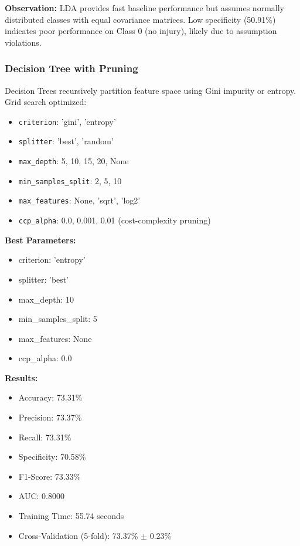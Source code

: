 \documentclass[12pt,man]{apa7}
\begin{document}
\textbf{Observation:} LDA provides fast baseline performance but assumes normally distributed classes with equal covariance matrices. Low specificity (50.91\%) indicates poor performance on Class 0 (no injury), likely due to assumption violations.

\subsubsection{Decision Tree with Pruning}

Decision Trees recursively partition feature space using Gini impurity or entropy. Grid search optimized:
\begin{itemize}
    \item \texttt{criterion}: 'gini', 'entropy'
    \item \texttt{splitter}: 'best', 'random'
    \item \texttt{max\_depth}: 5, 10, 15, 20, None
    \item \texttt{min\_samples\_split}: 2, 5, 10
    \item \texttt{max\_features}: None, 'sqrt', 'log2'
    \item \texttt{ccp\_alpha}: 0.0, 0.001, 0.01 (cost-complexity pruning)
\end{itemize}

\textbf{Best Parameters:}
\begin{itemize}
    \item criterion: 'entropy'
    \item splitter: 'best'
    \item max\_depth: 10
    \item min\_samples\_split: 5
    \item max\_features: None
    \item ccp\_alpha: 0.0
\end{itemize}

\textbf{Results:}
\begin{itemize}
    \item Accuracy: 73.31\%
    \item Precision: 73.37\%
    \item Recall: 73.31\%
    \item Specificity: 70.58\%
    \item F1-Score: 73.33\%
    \item AUC: 0.8000
    \item Training Time: 55.74 seconds
    \item Cross-Validation (5-fold): 73.37\% $\pm$ 0.23\%
\end{itemize}
\end{document}

